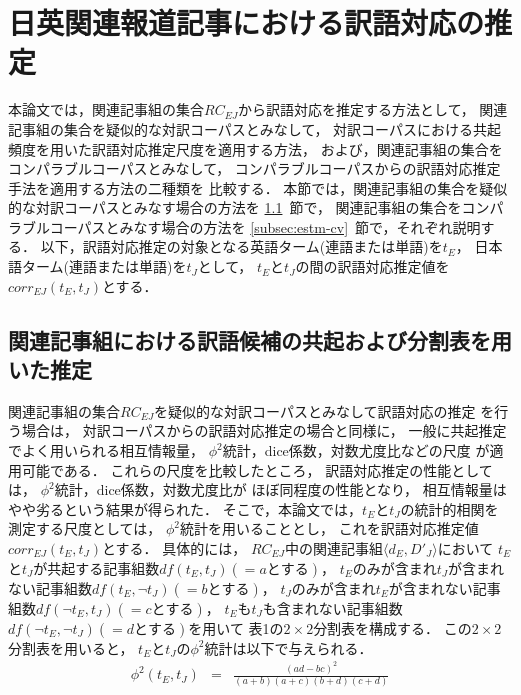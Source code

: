 \section{日英関連報道記事における訳語対応の推定}
\label{sec:msr}
\vspace*{-.0cm}

本論文では，関連記事組の集合$RC_{EJ}$から訳語対応を推定する方法として，
関連記事組の集合を疑似的な対訳コーパスとみなして，
対訳コーパスにおける共起頻度を用いた訳語対応推定尺度を適用する方法，
および，関連記事組の集合をコンパラブルコーパスとみなして，
コンパラブルコーパスからの訳語対応推定手法を適用する方法の二種類を
比較する．
本節では，関連記事組の集合を疑似的な対訳コーパスとみなす場合の方法を
\ref{subsec:estm-cont}~節で，
関連記事組の集合をコンパラブルコーパスとみなす場合の方法を
\ref{subsec:estm-cv}~節で，それぞれ説明する．
以下，訳語対応推定の対象となる英語ターム(連語または単語)を$t_E$，
日本語ターム(連語または単語)を$t_J$として，
$t_E$と$t_J$の間の訳語対応推定値を$corr_{EJ}(t_E,t_J)$とする．

\subsection{関連記事組における訳語候補の共起および分割表を用いた推定}
\label{subsec:estm-cont}

関連記事組の集合$RC_{EJ}$を疑似的な対訳コーパスとみなして訳語対応の推定
を行う場合は，
対訳コーパスからの訳語対応推定の場合と同様に，
一般に共起推定でよく用いられる相互情報量，
$\phi^2$統計，dice係数，対数尤度比などの尺度\cite{Matsumoto00a}
が適用可能である．
これらの尺度を比較したところ，
訳語対応推定の性能としては，
$\phi^2$統計，dice係数，対数尤度比が
ほぼ同程度の性能となり，
相互情報量はやや劣るという結果が得られた．
そこで，本論文では，$t_E$と$t_J$の統計的相関を測定する尺度としては，
$\phi^2$統計を用いることとし，
これを訳語対応推定値$corr_{EJ}(t_E,t_J)$とする．
具体的には，
$RC_{EJ}$中の関連記事組$\langle d_E,D'_J\rangle$において
$t_E$と$t_J$が共起する記事組数$df(t_E,t_J)(=aとする)$，
$t_E$のみが含まれ$t_J$が含まれない記事組数$df(t_E,\neg t_J)(=bとする)$，
$t_J$のみが含まれ$t_E$が含まれない記事組数$df(\neg t_E,t_J)(=cとする)$，
$t_E$も$t_J$も含まれない記事組数$df(\neg t_E,\neg t_J)(=dとする)$を用いて
表1の$2\times 2$分割表を構成する．
この$2\times 2$分割表を用いると，
$t_E$と$t_J$の$\phi^2$統計は以下で与えられる．
{
\begin{eqnarray*}
\phi^2(t_E,t_J) 
 & =& \frac{(ad - bc)^2}{(a + b)(a + c)(b + d)(c + d)}
\end{eqnarray*}
}

